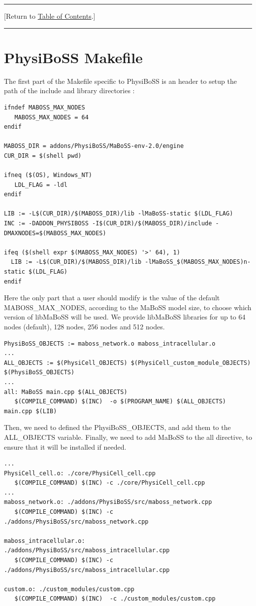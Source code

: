 \documentclass[12pt]{article}
\newcommand{\TOClink}{\begin{center}\hrule\vskip-5pt\phantom{.}\hfill[Return to \hyperlink{TOC}{Table of Contents}.]\hfill\phantom{.}\vskip3pt\hrule\end{center}}
\begin{document}
\TOClink


\section{PhysiBoSS Makefile}
\label{sec:physiboss_makefile}

The first part of the Makefile specific to PhysiBoSS is an header to setup the path of the include and library directories : 

\begin{verbatim}
ifndef MABOSS_MAX_NODES
   MABOSS_MAX_NODES = 64
endif

MABOSS_DIR = addons/PhysiBoSS/MaBoSS-env-2.0/engine
CUR_DIR = $(shell pwd)

ifneq ($(OS), Windows_NT)
   LDL_FLAG = -ldl
endif

LIB := -L$(CUR_DIR)/$(MABOSS_DIR)/lib -lMaBoSS-static $(LDL_FLAG)
INC := -DADDON_PHYSIBOSS -I$(CUR_DIR)/$(MABOSS_DIR)/include -DMAXNODES=$(MABOSS_MAX_NODES)

ifeq ($(shell expr $(MABOSS_MAX_NODES) '>' 64), 1)
  LIB := -L$(CUR_DIR)/$(MABOSS_DIR)/lib -lMaBoSS_$(MABOSS_MAX_NODES)n-static $(LDL_FLAG)
endif
\end{verbatim}
Here the only part that a user should modify is the value of the default MABOSS\_MAX\_NODES, according to the MaBoSS model size, to choose which version of libMaBoSS will be used. We provide libMaBoSS libraries for up to 64 nodes (default), 128 nodes, 256 nodes and 512 nodes. 
 
\begin{verbatim}
PhysiBoSS_OBJECTS := maboss_network.o maboss_intracellular.o
...
ALL_OBJECTS := $(PhysiCell_OBJECTS) $(PhysiCell_custom_module_OBJECTS) $(PhysiBoSS_OBJECTS)
...
all: MaBoSS main.cpp $(ALL_OBJECTS)
   $(COMPILE_COMMAND) $(INC)  -o $(PROGRAM_NAME) $(ALL_OBJECTS) main.cpp $(LIB)
\end{verbatim}

Then, we need to defined the PhysiBoSS\_OBJECTS, and add them to the ALL\_OBJECTS variable. Finally, we need to add MaBoSS to the all directive, to ensure that it will be installed if needed. 

\begin{verbatim}
...
PhysiCell_cell.o: ./core/PhysiCell_cell.cpp
   $(COMPILE_COMMAND) $(INC) -c ./core/PhysiCell_cell.cpp 
...
maboss_network.o: ./addons/PhysiBoSS/src/maboss_network.cpp
   $(COMPILE_COMMAND) $(INC) -c ./addons/PhysiBoSS/src/maboss_network.cpp

maboss_intracellular.o: ./addons/PhysiBoSS/src/maboss_intracellular.cpp
   $(COMPILE_COMMAND) $(INC) -c ./addons/PhysiBoSS/src/maboss_intracellular.cpp

custom.o: ./custom_modules/custom.cpp 
   $(COMPILE_COMMAND) $(INC)  -c ./custom_modules/custom.cpp

\end{verbatim}
\end{document}
